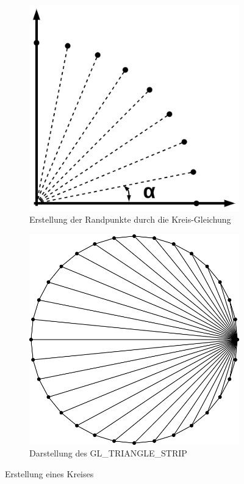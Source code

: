 \documentclass[doktyp=studarbeit]{TUBAFarbeiten}
\begin{document}
\begin{figure}[!h]
    \centering
    \begin{subfigure}[b]{0.4\textwidth}
        \centering
        \includegraphics[width=0.8\linewidth]{kreis-1.png}
        \caption{Erstellung der Randpunkte durch die Kreis-Gleichung}
    \end{subfigure}
    \begin{subfigure}[b]{0.4\textwidth}
        \centering
        \includegraphics[width=0.8\linewidth]{kreis-2.png}
        \caption{Darstellung des GL\_TRIANGLE\_STRIP}
    \end{subfigure}
    \caption{Erstellung eines Kreises}
    \label{fig:player}
\end{figure}
\end{document}
